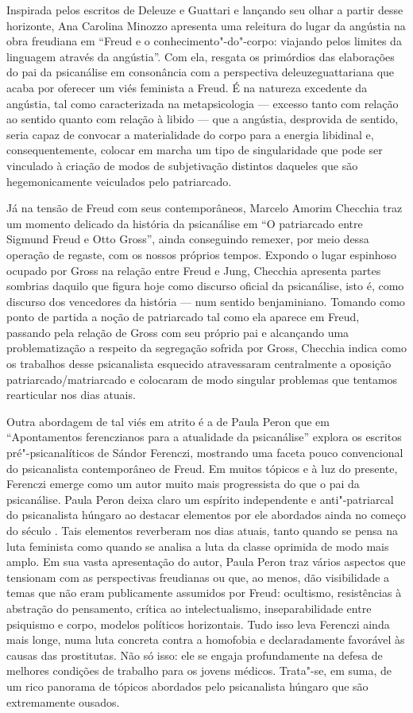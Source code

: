 Inspirada pelos escritos de Deleuze e Guattari e lançando seu olhar a
partir desse horizonte, Ana Carolina Minozzo apresenta uma releitura do
lugar da angústia na obra freudiana em ``Freud e o
conhecimento"-do"-corpo: viajando pelos limites da linguagem através da
angústia''. Com ela, resgata os primórdios das elaborações do pai da
psicanálise em consonância com a perspectiva deleuzeguattariana que
acaba por oferecer um viés feminista a Freud. É na natureza excedente da
angústia, tal como caracterizada na metapsicologia --- excesso tanto com
relação ao sentido quanto com relação à libido --- que a angústia,
desprovida de sentido, seria capaz de convocar a materialidade do corpo
para a energia libidinal e, consequentemente, colocar em marcha um tipo
de singularidade que pode ser vinculado à criação de modos de
subjetivação distintos daqueles que são hegemonicamente veiculados pelo
patriarcado.

Já na tensão de Freud com seus contemporâneos, Marcelo Amorim Checchia
traz um momento delicado da história da psicanálise em ``O patriarcado
entre Sigmund Freud e Otto Gross'', ainda conseguindo remexer, por meio
dessa operação de regaste, com os nossos próprios tempos. Expondo o
lugar espinhoso ocupado por Gross na relação entre Freud e Jung,
Checchia apresenta partes sombrias daquilo que figura hoje como discurso
oficial da psicanálise, isto é, como discurso dos vencedores da história
--- num sentido benjaminiano. Tomando como ponto de partida a noção de
patriarcado tal como ela aparece em Freud, passando pela relação de
Gross com seu próprio pai e alcançando uma problematização a respeito da
segregação sofrida por Gross, Checchia indica como os trabalhos desse
psicanalista esquecido atravessaram centralmente a oposição
patriarcado/matriarcado e colocaram de modo singular problemas que
tentamos rearticular nos dias atuais.

Outra abordagem de tal viés em atrito é a de Paula Peron que em
``Apontamentos ferenczianos para a atualidade da psicanálise'' explora
os escritos pré"-psicanalíticos de Sándor Ferenczi, mostrando uma faceta
pouco convencional do psicanalista contemporâneo de Freud. Em muitos
tópicos e à luz do presente, Ferenczi emerge como um autor muito mais
progressista do que o pai da psicanálise. Paula Peron deixa claro um
espírito independente e anti"-patriarcal do psicanalista húngaro ao
destacar elementos por ele abordados ainda no começo do século . Tais
elementos reverberam nos dias atuais, tanto quando se pensa na luta
feminista como quando se analisa a luta da classe oprimida de modo mais
amplo. Em sua vasta apresentação do autor, Paula Peron traz vários
aspectos que tensionam com as perspectivas freudianas ou que, ao menos,
dão visibilidade a temas que não eram publicamente assumidos por Freud:
ocultismo, resistências à abstração do pensamento, crítica ao
intelectualismo, inseparabilidade entre psiquismo e corpo, modelos
políticos horizontais. Tudo isso leva Ferenczi ainda mais longe, numa
luta concreta contra a homofobia e declaradamente favorável às causas
das prostitutas. Não só isso: ele se engaja profundamente na defesa de
melhores condições de trabalho para os jovens médicos. Trata"-se, em
suma, de um rico panorama de tópicos abordados pelo psicanalista húngaro
que são extremamente ousados.

